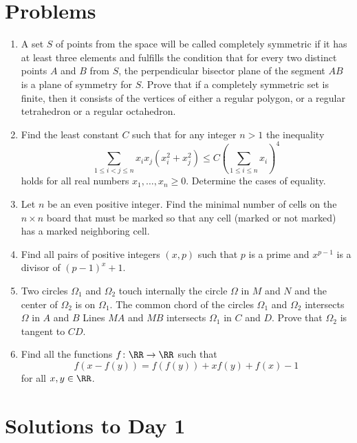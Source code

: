 \documentclass[11pt]{scrartcl}
\begin{document}
\section{Problems}
\begin{enumerate}[\bfseries 1.]
\item %
A set $S$ of points from the space will be called
completely symmetric if it has at least three elements
and fulfills the condition that for every two distinct points
$A$ and $B$ from $S$,
the perpendicular bisector plane of the segment $AB$
is a plane of symmetry for $S$.
Prove that if a completely symmetric set is finite,
then it consists of the vertices of either a regular polygon,
or a regular tetrahedron or a regular octahedron.

\item %
Find the least constant $C$ such that for any integer $n > 1$ the inequality
\[\sum_{1 \le i < j \le n} x_i x_j (x_i^2 + x_j^2)
  \le C \left( \sum_{1 \le i \le n} x_i \right)^4\]
holds for all real numbers $x_1, \dots, x_n \ge 0$.
Determine the cases of equality.

\item %
Let $n$ be an even positive integer.
Find the minimal number of cells on the $n \times n$ board
that must be marked so that any cell
(marked or not marked) has a marked neighboring cell.

\item %
Find all pairs of positive integers $(x,p)$
such that $p$ is a prime and $x^{p-1}$ is a divisor of $ (p-1)^{x}+1$.

\item %
Two circles $\Omega_{1}$ and $\Omega_{2}$ touch internally the circle
$\Omega$ in $M$ and $N$ and the center of $\Omega_{2}$ is on $\Omega_{1}$.
The common chord of the circles $\Omega_{1}$ and $\Omega_{2}$
intersects $\Omega$ in $A$ and $B$
Lines $MA$ and $MB$ intersects $\Omega_{1}$ in $C$ and $D$.
Prove that $\Omega_{2}$ is tangent to $CD$.

\item %
Find all the functions $f \colon \RR \to \RR$ such that
\[f(x-f(y))=f(f(y))+xf(y)+f(x)-1\]
for all $x,y \in \RR$.

\end{enumerate}
\pagebreak

\section{Solutions to Day 1}
\end{document}
